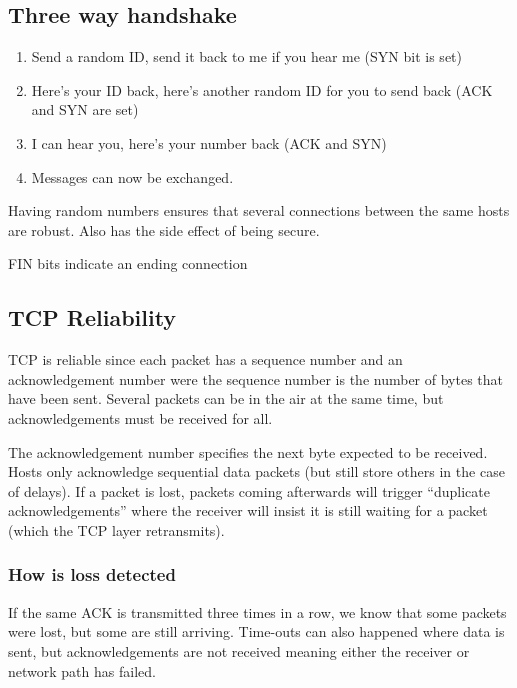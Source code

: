 \subsection{Three way handshake}\label{sub:three_way_handshake}

\begin{enumerate}
    \item Send a random ID, send it back to me if you hear me (SYN bit is set)
    \item Here's your ID back, here's another random ID for you to send back (ACK and SYN are set)
    \item I can hear you, here's your number back (ACK and SYN)
    \item Messages can now be exchanged.
\end{enumerate}
Having random numbers ensures that several connections between the same hosts are robust.
Also has the side effect of being secure.

\begin{note}
    FIN bits indicate an ending connection
\end{note}

\subsection{TCP Reliability}\label{sub:tcp_reliability}

TCP is reliable since each packet has a sequence number and an acknowledgement number were the sequence number is the number of bytes that have been sent.
Several packets can be in the air at the same time, but acknowledgements must be received for all.

The acknowledgement number specifies the next byte expected to be received.
Hosts only acknowledge sequential data packets (but still store others in the case of delays).
If a packet is lost, packets coming afterwards will trigger ``duplicate acknowledgements'' where the receiver will insist it is still waiting for a packet (which the TCP layer retransmits).

\subsubsection{How is loss detected}\label{ssub:how_is_loss_detected}

If the same ACK is transmitted three times in a row, we know that some packets were lost, but some are still arriving.
Time-outs can also happened where data is sent, but acknowledgements are not received meaning either the receiver or network path has failed.

